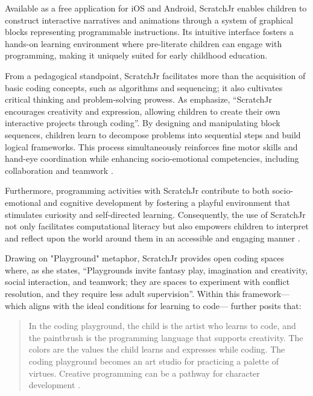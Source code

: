 \documentclass[english]{textolivre}
\begin{document}
Available as a free application for iOS and Android, ScratchJr enables children to construct interactive narratives and animations through a system of graphical blocks representing programmable instructions. Its intuitive interface fosters a hands-on learning environment where pre-literate children can engage with programming, making it uniquely suited for early childhood education.

From a pedagogical standpoint, ScratchJr facilitates more than the acquisition of basic coding concepts, such as algorithms and sequencing; it also cultivates critical thinking and problem-solving prowess. As \textcite[p. 2]{bers2016official} emphasize, “ScratchJr encourages creativity and expression, allowing children to create their own interactive projects through coding”. By designing and manipulating block sequences, children learn to decompose problems into sequential steps and build logical frameworks. This process simultaneously reinforces fine motor skills and hand-eye coordination while enhancing socio-emotional competencies, including collaboration and teamwork \cite{bers2008blocks}.

Furthermore, programming activities with ScratchJr contribute to both socio-emotional and cognitive development by fostering a playful environment that stimulates curiosity and self-directed learning. Consequently, the use of ScratchJr not only facilitates computational literacy but also empowers children to interpret and reflect upon the world around them in an accessible and engaging manner \cite{mirandapinto2020scratchjr}.

Drawing on  "Playground" metaphor, ScratchJr provides open coding spaces where, as she states, “Playgrounds invite fantasy play, imagination and creativity, social interaction, and teamwork; they are spaces to experiment with conflict resolution, and they require less adult supervision”. Within this framework—which aligns with the ideal conditions for learning to code—\textcite{bers2022beyond} further posits that:

\begin{quote}
    In the coding playground, the child is the artist who learns to code, and the paintbrush is the programming language that supports creativity. The colors are the values the child learns and expresses while coding. The coding playground becomes an art studio for practicing a palette of virtues. Creative programming can be a pathway for character development \cite[p. 145-146]{bers2022beyond}.
\end{quote}
\end{document}
